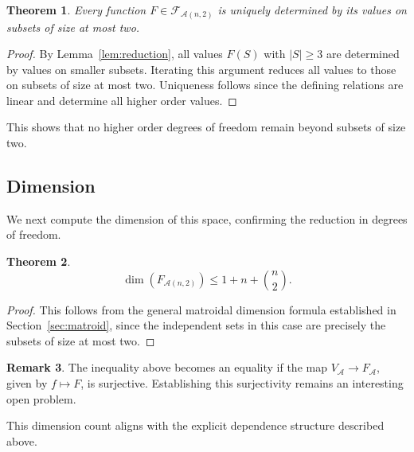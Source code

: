 \documentclass{amsart}
\newtheorem{theorem}{Theorem}[section]
\theoremstyle{definition}
\newtheorem{remark}[theorem]{Remark}
\begin{document}
\begin{theorem}\label{thm:k2structure}
Every function $F \in \mathcal{F}_{\mathcal{A}(n,2)}$ is uniquely determined by its values on subsets of size at most two.
\end{theorem}

\begin{proof}
By Lemma~\ref{lem:reduction}, all values $F(S)$ with $|S| \ge 3$ are determined by values on smaller subsets. Iterating this argument reduces all values to those on subsets of size at most two. Uniqueness follows since the defining relations are linear and determine all higher order values.
\end{proof}
\noindent
This shows that no higher order degrees of freedom remain beyond subsets of size two.
\subsection{Dimension}
We next compute the dimension of this space, confirming the reduction in degrees of freedom.
\begin{theorem}
\[
\dim(F_{\mathcal{A}(n,2)}) \leq 1 + n + \binom{n}{2}.
\]
\end{theorem}

\begin{proof}
This follows from the general matroidal dimension formula established in Section~\ref{sec:matroid},
since the independent sets in this case are precisely the subsets of size at most two.
\end{proof}
\begin{remark}
The inequality above becomes an equality if the map $V_{\mathcal{A}} \to F_{\mathcal{A}}$,
given by $f \mapsto F$, is surjective. Establishing this surjectivity remains an interesting
open problem.
\end{remark}
\noindent
This dimension count aligns with the explicit dependence structure described above.
\end{document}
